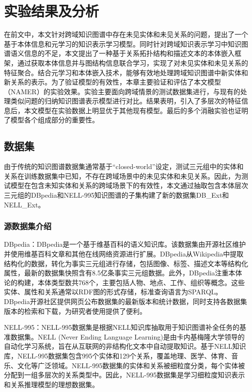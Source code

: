 \chapter{实验结果及分析}
在前文中，本文针对跨域知识图谱中存在未见实体和未见关系的问题，提出了一个基于本体信息和元学习的知识表示学习模型。同时针对跨域知识表示学习中知识图谱语义信息的不足，本文提出了一种基于关系拓扑结构和描述文本的本体嵌入框架，通过获取本体信息并与图结构信息联合学习，实现了对未见实体和未见关系的特征聚合。结合元学习和本体嵌入技术，能够有效地处理跨域知识图谱中新实体和新关系的表示。为了验证模型的有效性，本章主要验证和评估了本文模型（NAMER）的实验效果。实验主要面向跨域情景的测试数据集进行，与现有的处理类似问题的归纳知识图谱表示模型进行对比。结果表明，引入了多层次的特征信息后，本文模型在实验数据上明显优于其他现有模型。最后的多个消融实验也证明了模型各个组成部分的重要性。

\section{数据集}
由于传统的知识图谱数据集通常基于“closed-world”设定，测试三元组中的实体和关系在训练数据集中已知，不存在跨域场景中的未见实体和未见关系。因此，为测试模型在包含未知实体和关系的跨域场景下的有效性，本文通过抽取包含本体层次三元组的DBpedia和NELL-995知识图谱的子集构建了新的数据集DB\_Ext和NELL\_Ext。

\subsection{源数据集介绍}
DBpedia：DBpedia是一个基于维基百科的语义知识库。该数据集由开源社区维护并使用维基百科文章和其他在线网络资源进行扩展。DBpedia从Wikipedia中提取结构化的数据，转化为事实三元组进行存储，包括图像、标签、描述文本等结构化属性，最新的数据集快照含有8.5亿条事实三元组数据。此外，DBpedia注重本体论的构建，本体类型数共768个，主要包括人物、地点、工作、组织等概念。这些实体、属性和关系通常以RDF图的形式存储，标准查询语言为SPARQL。DBpedia开源社区提供网页公布数据集的最新版本和统计数据，同时支持各数据集版本的检索和下载，为研究者使用提供了便利。

NELL-995：NELL-995数据集是根据NELL知识库抽取用于知识图谱补全任务的基准数据集。NELL (Never Ending Language Learning)是由卡内基梅隆大学领导的自动化学习系统，旨在从互联网的非结构化文本中自动提取知识。基于NELL知识库，NELL-995数据集包含995个实体和129个关系，覆盖地理、医学、体育、音乐、文化等广泛领域。NELL-995数据集的实体和关系被细粒度分类，每个实体被分配到一组多层次的关系类型中。因此，NELL-995数据集是学习细粒度知识表示和关系推理模型的理想数据集。

